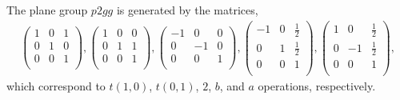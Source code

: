 The plane group $p2gg$ is generated by the matrices,
\begin{align*}
  \left(
    \begin{array}{cc|c}
        1 & 0 & 1 \\
        0 & 1 & 0 \\
        \hline
        0 & 0 & 1 \\
    \end{array}
  \right),
  \left(
    \begin{array}{cc|c}
        1 & 0 & 0 \\
        0 & 1 & 1 \\
        \hline
        0 & 0 & 1 \\
    \end{array}
  \right),
  \left(
    \begin{array}{cc|c}
        -1 & 0 & 0 \\
        0 & -1 & 0 \\
        \hline
        0 & 0 & 1 \\
    \end{array}
  \right),
  \left(
    \begin{array}{cc|c}
        -1 & 0 & \frac{1}{2} \\
        0 & 1 & \frac{1}{2} \\
        \hline
        0 & 0 & 1 \\
    \end{array}
  \right),
  \left(
    \begin{array}{cc|c}
        1 & 0 & \frac{1}{2} \\
        0 & -1 & \frac{1}{2} \\
        \hline
        0 & 0 & 1 \\
    \end{array}
  \right),
\end{align*}
which correspond to $t(1, 0)$, $t(0, 1)$, $2$, $b$, and $a$ operations, respectively.
